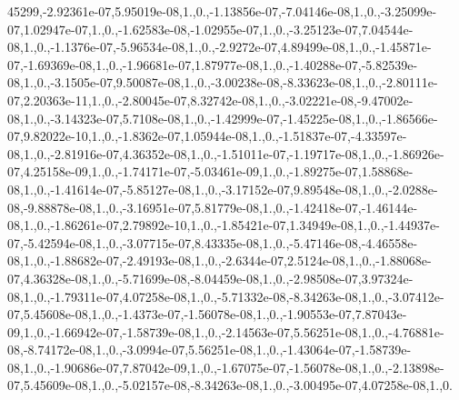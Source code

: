 \begin{DoxyCompactItemize}
45299,-\/2.\-92361e-\/07,5.\-95019e-\/08,1.,0.,-\/1.\-13856e-\/07,-\/7.\-04146e-\/08,1.,0.,-\/3.\-25099e-\/07,1.\-02947e-\/07,1.,0.,-\/1.\-62583e-\/08,-\/1.\-02955e-\/07,1.,0.,-\/3.\-25123e-\/07,7.\-04544e-\/08,1.,0.,-\/1.\-1376e-\/07,-\/5.\-96534e-\/08,1.,0.,-\/2.\-9272e-\/07,4.\-89499e-\/08,1.,0.,-\/1.\-45871e-\/07,-\/1.\-69369e-\/08,1.,0.,-\/1.\-96681e-\/07,1.\-87977e-\/08,1.,0.,-\/1.\-40288e-\/07,-\/5.\-82539e-\/08,1.,0.,-\/3.\-1505e-\/07,9.\-50087e-\/08,1.,0.,-\/3.\-00238e-\/08,-\/8.\-33623e-\/08,1.,0.,-\/2.\-80111e-\/07,2.\-20363e-\/11,1.,0.,-\/2.\-80045e-\/07,8.\-32742e-\/08,1.,0.,-\/3.\-02221e-\/08,-\/9.\-47002e-\/08,1.,0.,-\/3.\-14323e-\/07,5.\-7108e-\/08,1.,0.,-\/1.\-42999e-\/07,-\/1.\-45225e-\/08,1.,0.,-\/1.\-86566e-\/07,9.\-82022e-\/10,1.,0.,-\/1.\-8362e-\/07,1.\-05944e-\/08,1.,0.,-\/1.\-51837e-\/07,-\/4.\-33597e-\/08,1.,0.,-\/2.\-81916e-\/07,4.\-36352e-\/08,1.,0.,-\/1.\-51011e-\/07,-\/1.\-19717e-\/08,1.,0.,-\/1.\-86926e-\/07,4.\-25158e-\/09,1.,0.,-\/1.\-74171e-\/07,-\/5.\-03461e-\/09,1.,0.,-\/1.\-89275e-\/07,1.\-58868e-\/08,1.,0.,-\/1.\-41614e-\/07,-\/5.\-85127e-\/08,1.,0.,-\/3.\-17152e-\/07,9.\-89548e-\/08,1.,0.,-\/2.\-0288e-\/08,-\/9.\-88878e-\/08,1.,0.,-\/3.\-16951e-\/07,5.\-81779e-\/08,1.,0.,-\/1.\-42418e-\/07,-\/1.\-46144e-\/08,1.,0.,-\/1.\-86261e-\/07,2.\-79892e-\/10,1.,0.,-\/1.\-85421e-\/07,1.\-34949e-\/08,1.,0.,-\/1.\-44937e-\/07,-\/5.\-42594e-\/08,1.,0.,-\/3.\-07715e-\/07,8.\-43335e-\/08,1.,0.,-\/5.\-47146e-\/08,-\/4.\-46558e-\/08,1.,0.,-\/1.\-88682e-\/07,-\/2.\-49193e-\/08,1.,0.,-\/2.\-6344e-\/07,2.\-5124e-\/08,1.,0.,-\/1.\-88068e-\/07,4.\-36328e-\/08,1.,0.,-\/5.\-71699e-\/08,-\/8.\-04459e-\/08,1.,0.,-\/2.\-98508e-\/07,3.\-97324e-\/08,1.,0.,-\/1.\-79311e-\/07,4.\-07258e-\/08,1.,0.,-\/5.\-71332e-\/08,-\/8.\-34263e-\/08,1.,0.,-\/3.\-07412e-\/07,5.\-45608e-\/08,1.,0.,-\/1.\-4373e-\/07,-\/1.\-56078e-\/08,1.,0.,-\/1.\-90553e-\/07,7.\-87043e-\/09,1.,0.,-\/1.\-66942e-\/07,-\/1.\-58739e-\/08,1.,0.,-\/2.\-14563e-\/07,5.\-56251e-\/08,1.,0.,-\/4.\-76881e-\/08,-\/8.\-74172e-\/08,1.,0.,-\/3.\-0994e-\/07,5.\-56251e-\/08,1.,0.,-\/1.\-43064e-\/07,-\/1.\-58739e-\/08,1.,0.,-\/1.\-90686e-\/07,7.\-87042e-\/09,1.,0.,-\/1.\-67075e-\/07,-\/1.\-56078e-\/08,1.,0.,-\/2.\-13898e-\/07,5.\-45609e-\/08,1.,0.,-\/5.\-02157e-\/08,-\/8.\-34263e-\/08,1.,0.,-\/3.\-00495e-\/07,4.\-07258e-\/08,1.,0.
\end{DoxyCompactItemize}
